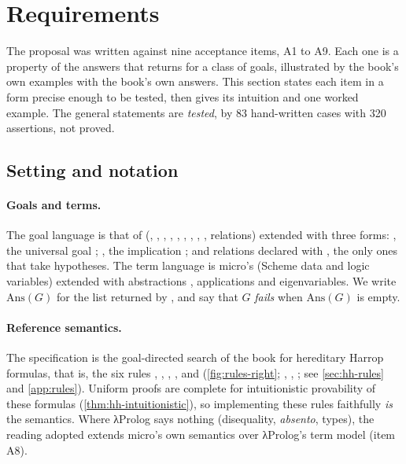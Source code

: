 \section{Requirements}\label{sec:design-req}

The proposal was written against nine acceptance items, A1 to A9. Each one is a property of the
answers that  returns for a class of goals, illustrated by the book's own examples with the
book's own answers. This section states each item in a form precise enough to be tested, then gives
its intuition and one worked example. The general statements are \emph{tested}, by 83 hand-written cases
with 320 assertions, not proved.

\subsection{Setting and notation}\label{sec:design-notation}

\paragraph{Goals and terms.} The goal language is that of \micro{} (, , ,
, , , , , , relations) extended with
three forms: , the universal goal ; , the implication
; and relations declared with , the only ones that take
hypotheses. The term language is micro's (Scheme data and logic variables) extended with abstractions
, applications  and eigenvariables. We write $\mathrm{Ans}(G)$ for the list
returned by , and say that $G$ \emph{fails} when $\mathrm{Ans}(G)$ is empty.

\paragraph{Reference semantics.} The specification is the goal-directed search of the book for
hereditary Harrop formulas, that is, the six rules , , , ,  and 
(\cref{fig:rules-right}; , , ; see \cref{sec:hh-rules} and \cref{app:rules}). Uniform proofs are complete for intuitionistic provability of
these formulas (\cref{thm:hh-intuitionistic}), so implementing these rules faithfully \emph{is} the
semantics. Where λProlog says nothing (disequality, \emph{absento}, types), the reading adopted extends
micro's own semantics over λProlog's term model (item A8).

